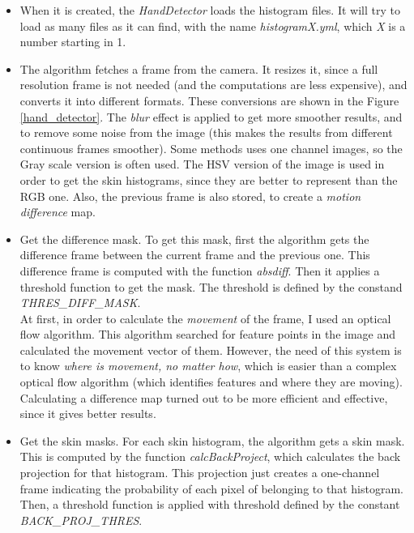 \documentclass[11pt,a4paper]{article}
\begin{document}
\begin{itemize}

\item When it is created, the \textit{HandDetector} loads the histogram files. It will try to load as many files as it can find, with the name \textit{histogramX.yml}, which \textit{X} is a number starting in 1.

\item The algorithm fetches a frame from the camera. It resizes it, since a full resolution frame is not needed (and the computations are less expensive), and converts it into different formats. These conversions are shown in the Figure \ref{hand_detector}. The \textit{blur} effect is applied to get more smoother results, and to remove some noise from the image (this makes the results from different continuous frames smoother). Some methods uses one channel images, so the Gray scale version is often used. The HSV version of the image is used in order to get the skin histograms, since they are better to represent than the RGB one. Also, the previous frame is also stored, to create a \textit{motion difference} map.

\item Get the difference mask. To get this mask, first the algorithm gets the difference frame between the current frame and the previous one. This difference frame is computed with the function \textit{absdiff}. Then it applies a threshold function to get the mask. The threshold is defined by the constand \textit{THRES\_DIFF\_MASK}.\\

At first, in order to calculate the \textit{movement} of the frame, I used an optical flow algorithm. This algorithm searched for feature points in the image and calculated the movement vector of them. However, the need of this system is to know \textit{where is movement, no matter how}, which is easier than a complex optical flow algorithm (which identifies features and where they are moving). Calculating a difference map turned out to be more efficient and effective, since it gives better results.

\item Get the skin masks. For each skin histogram, the algorithm gets a skin mask. This is computed by the function \textit{calcBackProject}, which calculates the back projection for that histogram. This projection just creates a one-channel frame indicating the probability of each pixel of belonging to that histogram. Then, a threshold function is applied with threshold defined by the constant \textit{BACK\_PROJ\_THRES}.\\


\end{itemize}
\end{document}
